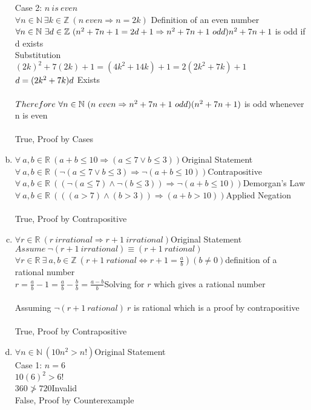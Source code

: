 \documentclass[11pt,letterpaper]{article}
\begin{document}
\begin{enumerate}[(a)]
Case 2: $n~is~even$\\
$\forall n\in\mathbb{N}~\exists k\in\mathbb{Z}~(n~even\Rightarrow n =2k)$ \hfill Definition of an even number\\
$\forall n\in\mathbb{N}~\exists d\in\mathbb{Z}~(n^2+7n+1 = 2d+1 \Rightarrow n^2+7n+1~odd)\hfill n^2+7n+1$ is odd if d exists\\
Substitution\\
$(2k)^2 + 7(2k) + 1 = (4k^2 + 14k) + 1 = 2(2k^2 + 7k) + 1$\\
$d = (2k^2 + 7k)\hfill d$ Exists\\
\\
$Therefore~\forall n\in\mathbb{N}~(n~even\Rightarrow n^2 +7n +1~odd)\hfill (n^2 +7n +1)$ is odd whenever n is even\\
\\
True, Proof by Cases
\\
\item
$\forall ~a,b\in\mathbb{R}~(a+b\leq 10\Rightarrow (a\leq 7 \vee b\leq 3))$\hfill Original Statement\\
$\forall ~a,b\in\mathbb{R}~(\neg(a\leq 7 \vee b\leq 3) \Rightarrow \neg(a+b\leq 10))$\hfill Contrapositive\\
$\forall ~a,b\in\mathbb{R}~((\neg(a\leq 7) \wedge \neg(b\leq 3)) \Rightarrow \neg(a+b\leq 10))$\hfill Demorgan's Law\\
$\forall ~a,b\in\mathbb{R}~(((a> 7) \wedge (b> 3)) \Rightarrow (a+b> 10))$\hfill Applied Negation\\
\\
True, Proof by Contrapositive
\clearpage

\item
$\forall r\in\mathbb{R}~(r~irrational\Rightarrow r+1~irrational)$\hfill Original Statement\\
$Assume~\neg(r+1~irrational)\equiv (r+1~rational)$\\
$\forall r\in\mathbb{R}~\exists~a,b\in\mathbb{Z}~(r+1~rational\Leftrightarrow r+1=\frac{a}{b})(b\neq 0)$\hfill definition of a rational number\\
$r= \frac{a}{b}-1=\frac{a}{b}-\frac{b}{b}=\frac{a-b}{b}$\hfill Solving for $r$ which gives a rational number\\
\\
Assuming $\neg(r+1~rational)~r$ is rational which is a proof by contrapositive\\
\\
True, Proof by Contrapositive
\\
\item
$\forall n\in\mathbb{N}~(10n^2>n!)$\hfill Original Statement\\
Case 1: $n=6$\\
$10(6)^2 > 6!$\\
$360 \not> 720$\hfill Invalid\\

False, Proof by Counterexample
\end{enumerate}
\end{document}
